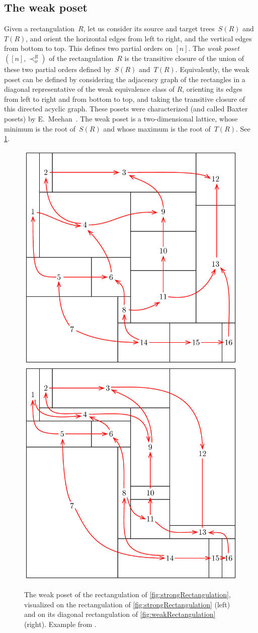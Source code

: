 \documentclass{amsart}
\theoremstyle{definition}
\newcommand{\darkblue}{\color{darkblue}} %
\newcommand{\defn}[1]{\textsl{\darkblue #1}} %
\begin{document}

\subsection{The weak poset}
\label{subsec:weakPoset}

Given a rectangulation~$R$, let us consider its source and target trees~$S(R)$ and~$T(R)$, and orient the horizontal edges from left to right, and the vertical edges from bottom to top.
This defines two partial orders on $[n]$.
The \defn{weak poset}~$([n],\prec_w^R)$ of the rectangulation~$R$ is the transitive closure of the union of these two partial orders defined by~$S(R)$ and~$T(R)$.
Equivalently, the weak poset can be defined by considering the adjacency graph of the rectangles in a diagonal representative of the weak equivalence class of $R$, orienting its edges from left to right and from bottom to top, and taking the transitive closure of this directed acyclic graph.
These posets were characterized (and called Baxter posets) by E.~Meehan~\cite{MR4014603}.
The weak poset is a two-dimensional lattice, whose minimum is the root of~$S(R)$ and whose maximum is the root of~$T(R)$.
See \cref{fig:weakPoset}.

\begin{figure}
	\centerline{\includegraphics[width=.4\textwidth]{weakPoset1} \qquad \includegraphics[width=.4\textwidth]{weakPoset2}}
	\caption{The weak poset of the rectangulation of \cref{fig:strongRectangulation}, visualized on the rectangulation of \cref{fig:strongRectangulation} (left) and on its diagonal rectangulation of \cref{fig:weakRectangulation} (right). Example from \cite{ACFF24}.}
	\label{fig:weakPoset}
\end{figure}
\end{document}
